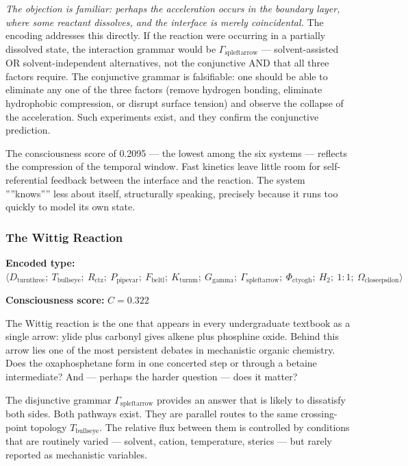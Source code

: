 \documentclass[12pt,a4paper]{article}
\begin{document}
\emph{The objection is familiar: perhaps the acceleration occurs in the boundary layer, where some reactant dissolves, and the interface is merely coincidental.} The encoding addresses this directly. If the reaction were occurring in a partially dissolved state, the interaction grammar would be $\Gamma_{\text{spleftarrow}}$ --- solvent-assisted OR solvent-independent alternatives, not the conjunctive AND that all three factors require. The conjunctive grammar is falsifiable: one should be able to eliminate any one of the three factors (remove hydrogen bonding, eliminate hydrophobic compression, or disrupt surface tension) and observe the collapse of the acceleration. Such experiments exist, and they confirm the conjunctive prediction.

The consciousness score of 0.2095 --- the lowest among the six systems --- reflects the compression of the temporal window. Fast kinetics leave little room for self-referential feedback between the interface and the reaction. The system ''''knows'''' less about itself, structurally speaking, precisely because it runs too quickly to model its own state.

\subsubsection{The Wittig Reaction}

\textbf{Encoded type:} $\langle D_{\text{turnthree}};\ T_{\text{bullseye}};\ R_{\text{ctz}};\ P_{\text{pipevar}};\ F_{\text{beltl}};\ K_{\text{turnm}};\ G_{\text{gamma}};\ \Gamma_{\text{spleftarrow}};\ \Phi_{\text{ctyogh}};\ H_2;\ 1{:}1;\ \Omega_{\text{closeepsilon}} \rangle$

\textbf{Consciousness score:} $C = 0.322$

The Wittig reaction is the one that appears in every undergraduate textbook as a single arrow: ylide plus carbonyl gives alkene plus phosphine oxide. Behind this arrow lies one of the most persistent debates in mechanistic organic chemistry. Does the oxaphosphetane form in one concerted step or through a betaine intermediate? And --- perhaps the harder question --- does it matter?

The disjunctive grammar $\Gamma_{\text{spleftarrow}}$ provides an answer that is likely to dissatisfy both sides. Both pathways exist. They are parallel routes to the same crossing-point topology $T_{\text{bullseye}}$. The relative flux between them is controlled by conditions that are routinely varied --- solvent, cation, temperature, sterics --- but rarely reported as mechanistic variables.
\end{document}
